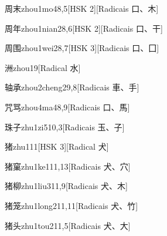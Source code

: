 \begin{entry}{周末}{zhou1mo4}{8,5}[HSK 2][Radicais ⼝、⽊]
\end{entry}

\begin{entry}{周年}{zhou1nian2}{8,6}[HSK 2][Radicais ⼝、⼲]
\end{entry}

\begin{entry}{周围}{zhou1wei2}{8,7}[HSK 3][Radicais ⼝、⼞]
\end{entry}

\begin{entry}{洲}{zhou1}{9}[Radical ⽔]
\end{entry}

\begin{entry}{轴承}{zhou2cheng2}{9,8}[Radicais ⾞、⼿]
\end{entry}

\begin{entry}{咒骂}{zhou4ma4}{8,9}[Radicais ⼝、⾺]
\end{entry}

\begin{entry}{珠子}{zhu1zi5}{10,3}[Radicais ⽟、⼦]
\end{entry}

\begin{entry}{猪}{zhu1}{11}[HSK 3][Radical ⽝]
\end{entry}

\begin{entry}{猪窠}{zhu1ke1}{11,13}[Radicais ⽝、⽳]
\end{entry}

\begin{entry}{猪柳}{zhu1liu3}{11,9}[Radicais ⽝、⽊]
\end{entry}

\begin{entry}{猪笼}{zhu1long2}{11,11}[Radicais ⽝、⽵]
\end{entry}

\begin{entry}{猪头}{zhu1tou2}{11,5}[Radicais ⽝、⼤]
\end{entry}

